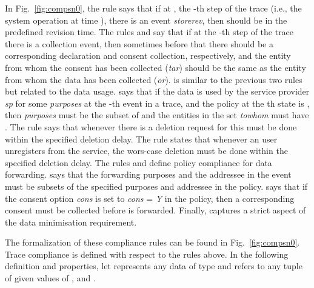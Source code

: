 \documentclass[a4paper]{article}
\begin{document}
In Fig.~\ref{fig:compsn0}, the rule  says that if at  , the -th step of the trace (i.e., the system operation at time ), there is an event  \textit{storerev}, then  should be in the predefined revision time. The rules  and  say that if at the -th step of the trace there is a collection event, then sometimes before that there should be a corresponding declaration and consent collection, respectively, and the entity from whom the consent has been collected (\textit{tar}) should be the same as the entity from whom the data has been collected (\textit{or}).   is similar to the previous two rules but related to the data usage.   says that if the data  is used by the service provider \textit{sp} for some \textit{purposes} at the -th event in a trace, and the policy at the th state is  , then \textit{purposes} must be the subset of  and the entities in the set \textit{towhom} must have . The rule  says that whenever there is a deletion request for  this must be done within the specified deletion delay. The rule  states that whenever an user unregisters from the service, the wors-case deletion must be done within the specified deletion delay. The rules  and  define policy compliance for data forwarding.  says that the forwarding purposes and the addressee in the event must be subsets of the specified purposes and addressee in the policy.  says that if the consent option \textit{cons} is set to \textit{cons} = \textit{Y} in the policy, then a corresponding consent must be collected before  is forwarded. Finally,  captures a strict aspect of the data minimisation requirement.  

The formalization of these compliance rules can be found in Fig.~\ref{fig:compsn0}. Trace compliance is defined with respect to the rules above. In the following definition and properties, let  represents any data of type  and  refers to any tuple of given values of ,  and . 
\end{document}
